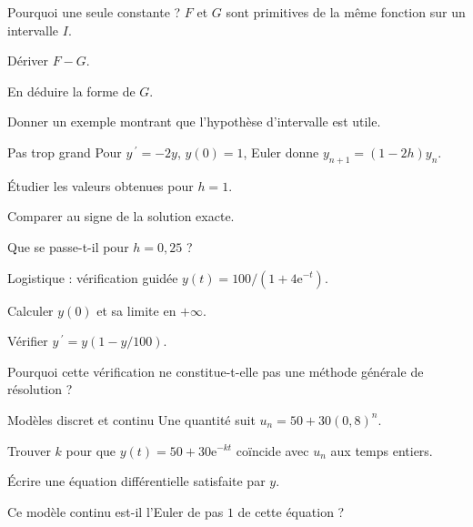 \begingroup\renewcommand{\otBesoinPlace}[1]{}\begin{minipage}{\linewidth}
\begin{exercice}[3]{Pourquoi une seule constante ?}
$F$ et $G$ sont primitives de la même fonction sur un intervalle $I$.
\begin{questions}
\item Dériver $F-G$.
\item En déduire la forme de $G$.
\item Donner un exemple montrant que l’hypothèse d’intervalle est utile.
\end{questions}
\end{exercice}
\begin{exercice}[3]{Pas trop grand}
Pour $y\,\!^{\prime}=-2y$, $y(0)=1$, Euler donne $y_{n+1}=(1-2h)y_n$.
\begin{questions}
\item Étudier les valeurs obtenues pour $h=1$.
\item Comparer au signe de la solution exacte.
\item Que se passe-t-il pour $h=0{,}25$ ?
\end{questions}
\end{exercice}
\begin{exercice}[3]{Logistique : vérification guidée}
$y(t)=100/(1+4\mathrm e^{-t})$.
\begin{questions}
\item Calculer $y(0)$ et sa limite en $+\infty$.
\item Vérifier $y\,\!^{\prime}=y(1-y/100)$.
\item Pourquoi cette vérification ne constitue-t-elle pas une méthode générale de résolution ?
\end{questions}
\end{exercice}
\begin{exercice}[3]{Modèles discret et continu}
Une quantité suit $u_n=50+30(0{,}8)^n$.
\begin{questions}
\item Trouver $k$ pour que $y(t)=50+30\mathrm e^{-kt}$ coïncide avec $u_n$ aux temps entiers.
\item Écrire une équation différentielle satisfaite par $y$.
\item Ce modèle continu est-il l’Euler de pas $1$ de cette équation ?
\end{questions}
\end{exercice}
\end{minipage}\endgroup
